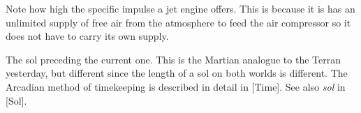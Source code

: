 Note how high the specific impulse a jet engine offers. This is because it is has an unlimited supply of free air from the atmosphere to feed the air compressor so it does not have to carry its own supply.

The sol preceding the current one. This is the Martian analogue to the Terran yesterday, but different since the length of a sol on both worlds is different. The Arcadian method of timekeeping is described in detail in [Time]. See also {\it sol} in [Sol].

\StopChapter

